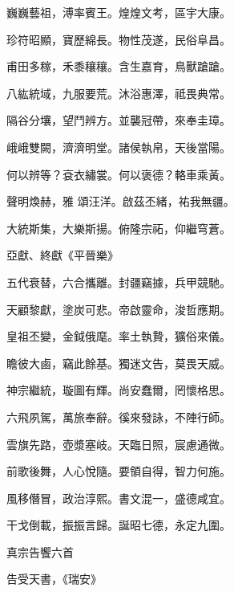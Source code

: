 \begin{pinyinscope}
 巍巍藝祖，溥率賓王。煌煌文考，區宇大康。



 珍符昭顯，寶歷綿長。物性茂遂，民俗阜昌。



 甫田多稼，禾黍穰穰。含生嘉育，鳥獸蹌蹌。



 八紘統域，九服要荒。沐浴惠澤，祗畏典常。



 隔谷分壤，望鬥辨方。並襲冠帶，來奉圭璋。



 峨峨雙闕，濟濟明堂。諸侯執帛，天後當陽。



 何以辨等？袞衣繡裳。何以褒德？輅車乘黃。



 聲明煥赫，雅
 頌汪洋。啟茲丕緒，祐我無疆。



 大統斯集，大樂斯揚。俯隆宗祏，仰繼穹蒼。



 亞獻、終獻《平晉樂》



 五代衰替，六合攜離。封疆竊據，兵甲競馳。



 天顧黎獻，塗炭可悲。帝啟靈命，浚哲應期。



 皇祖丕變，金鉞俄麾。率土執贄，獷俗來儀。



 瞻彼大鹵，竊此餘基。獨迷文告，莫畏天威。



 神宗繼統，璇圖有輝。尚安蠢爾，罔懷格思。



 六飛夙駕，萬旅奉辭。徯來發詠，不陣行師。



 雲旗先路，壺漿塞岐。天臨日照，宸慮通微。



 前歌後舞，人心悅隨。要領自得，智力何施。



 風移僭冒，政治淳熙。書文混一，盛德咸宜。



 干戈倒載，振振言歸。誕昭七德，永定九圍。



 真宗告饗六首



 告受天書，《瑞安》




\end{pinyinscope}
